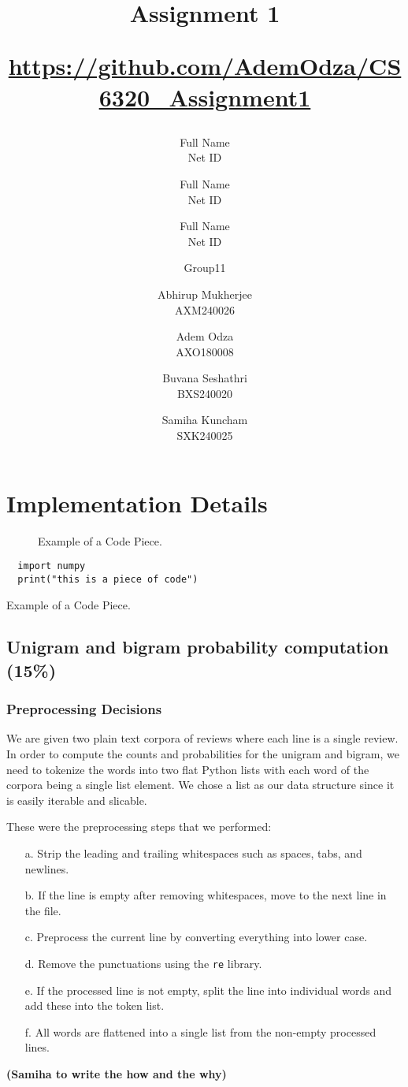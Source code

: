 \documentclass[a4paper]{article}
\title{Assignment 1 \\ \begin{small}\url{https://github.com/AdemOdza/CS6320_Assignment1}\end{small}}
\author{Full Name \\ Net ID \and Full Name \\ Net ID \and Full Name \\ Net ID}
\author{Group11 \and  Abhirup Mukherjee \\ AXM240026 \and Adem Odza \\ AXO180008  \and Buvana Seshathri \\ BXS240020 \and Samiha Kuncham \\SXK240025}
\date{}
\begin{document}
\maketitle



\section{Implementation Details}

\begin{figure}[h]
\centering
\small
{}
\caption{Example of a Code Piece.}
\label{fig:eg}
\end{figure}


\begin{listing}[ht]
\begin{verbatim}
  import numpy  
  print("this is a piece of code")
\end{verbatim}
\caption{Example of a Code Piece.}
\label{lst:eg}
\end{listing}


\subsection{Unigram and bigram probability computation (15\%)}

\subsubsection{Preprocessing Decisions}
We are given two plain text corpora of reviews where each line is a single review. In order to compute the counts and probabilities for the unigram and bigram, we need to tokenize the words into two flat Python lists with each word of the corpora being a single list element. We chose a list as our data structure since it is easily iterable and slicable.

These were the preprocessing steps that we performed:
\begin{enumerate}
    \item[a.] Strip the leading and trailing whitespaces such as spaces, tabs, and newlines.
    \item[b.] If the line is empty after removing whitespaces, move to the next line in the file.
    \item[c.] Preprocess the current line by converting everything into lower case.
    \item[d.] Remove the punctuations using the \texttt{re} library.
    \item[e.] If the processed line is not empty, split the line into individual words and add these into the token list.
    \item[f.] All words are flattened into a single list from the non-empty processed lines.
\end{enumerate}
\textbf{(Samiha to write the how and the why)}
\end{document}
